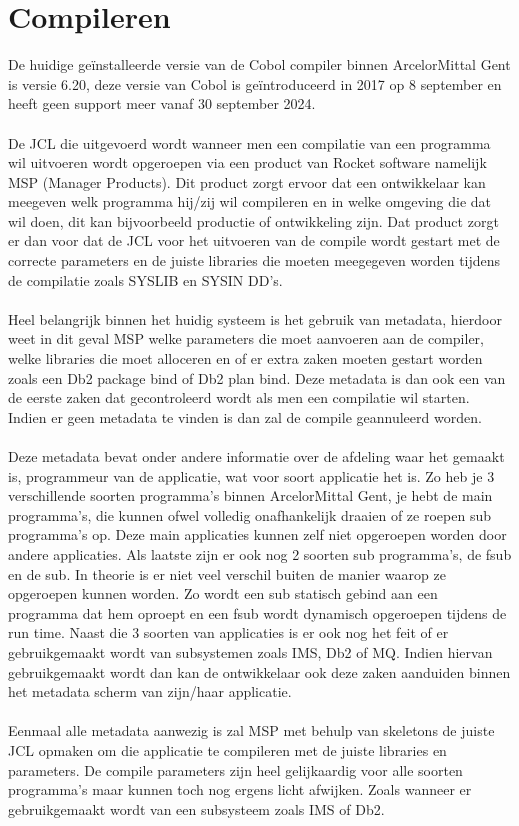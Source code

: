 \section{Compileren}
\label{sec:compileren}
De huidige geïnstalleerde versie van de Cobol compiler binnen ArcelorMittal Gent is versie 6.20, deze versie van Cobol is geïntroduceerd in 2017 op 8 september en heeft geen support meer vanaf 30 september 2024.
\\ \\
De JCL die uitgevoerd wordt wanneer men een compilatie van een programma wil uitvoeren wordt opgeroepen via een product van Rocket software namelijk MSP (Manager Products). Dit product zorgt ervoor dat een ontwikkelaar kan meegeven welk programma hij/zij wil compileren en in welke omgeving die dat wil doen, dit kan bijvoorbeeld productie of ontwikkeling zijn. Dat product zorgt er dan voor dat de JCL voor het uitvoeren van de compile wordt gestart met de correcte parameters en de juiste libraries die moeten meegegeven worden tijdens de compilatie zoals SYSLIB en SYSIN DD's.
\\ \\
Heel belangrijk binnen het huidig systeem is het gebruik van metadata, hierdoor weet in dit geval MSP welke parameters die moet aanvoeren aan de compiler, welke libraries die moet alloceren en of er extra zaken moeten gestart worden zoals een Db2 package bind of Db2 plan bind. Deze metadata is dan ook een van de eerste zaken dat gecontroleerd wordt als men een compilatie wil starten. Indien er geen metadata te vinden is dan zal de compile geannuleerd worden. 
\\ \\
Deze metadata bevat onder andere informatie over de afdeling waar het gemaakt is, programmeur van de applicatie, wat voor soort applicatie het is. Zo heb je 3 verschillende soorten programma's binnen ArcelorMittal Gent, je hebt de main programma's, die kunnen ofwel volledig onafhankelijk draaien of ze roepen sub programma's op. Deze main applicaties kunnen zelf niet opgeroepen worden door andere applicaties. Als laatste zijn er ook nog 2 soorten sub programma's, de fsub en de sub. In theorie is er niet veel verschil buiten de manier waarop ze opgeroepen kunnen worden. Zo wordt een sub statisch gebind aan een programma dat hem oproept en een fsub wordt dynamisch opgeroepen tijdens de run time. Naast die 3 soorten van applicaties is er ook nog het feit of er gebruikgemaakt wordt van subsystemen zoals IMS, Db2 of MQ. Indien hiervan gebruikgemaakt wordt dan kan de ontwikkelaar ook deze zaken aanduiden binnen het metadata scherm van zijn/haar applicatie. 
\\ \\
Eenmaal alle metadata aanwezig is zal MSP met behulp van skeletons de juiste JCL opmaken om die applicatie te compileren met de juiste libraries en parameters. De compile parameters zijn heel gelijkaardig voor alle soorten programma's maar kunnen toch nog ergens licht afwijken. Zoals wanneer er gebruikgemaakt wordt van een subsysteem zoals IMS of Db2.
\\ \\

